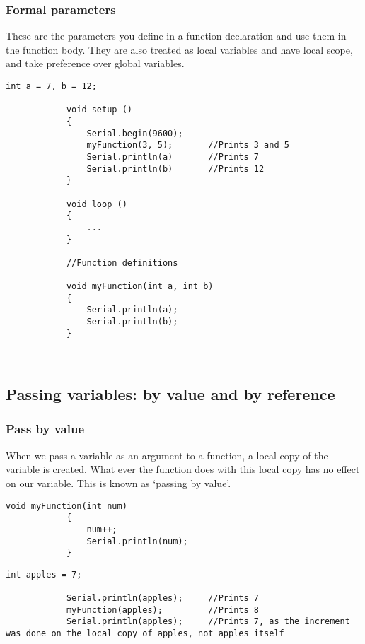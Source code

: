 \documentclass{article}
\begin{document}
		\subsubsection{Formal parameters}

			These are the parameters you define in a function declaration and use them in the function body. They are also treated as local variables and have local scope, and take preference over global variables.

			\begin{lstlisting}[gobble=12]
			int a = 7, b = 12;

			void setup ()
			{
				Serial.begin(9600);
				myFunction(3, 5);		//Prints 3 and 5
				Serial.println(a)		//Prints 7
				Serial.println(b)		//Prints 12
			}

			void loop ()
			{
				...
			}

			//Function definitions

			void myFunction(int a, int b)
			{
				Serial.println(a);
				Serial.println(b);
			}

			
			\end{lstlisting}
				

	\subsection{Passing variables: by value and by reference}

		\subsubsection{Pass by value}

			When we pass a variable as an argument to a function, a local copy of the variable is created. What ever the function does with this local copy has no effect on our variable. This is known as `passing by value'.

			\begin{lstlisting}[gobble=12]
			void myFunction(int num)
			{
				num++;
				Serial.println(num);
			}
			\end{lstlisting}

			\begin{lstlisting}[gobble=12]
			int apples = 7;

			Serial.println(apples);		//Prints 7
			myFunction(apples);			//Prints 8
			Serial.println(apples);		//Prints 7, as the increment was done on the local copy of apples, not apples itself
			\end{lstlisting}
\end{document}
